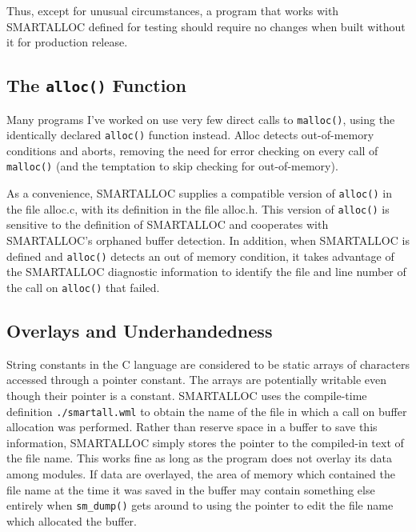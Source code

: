 Thus, except for unusual circumstances, a program that works with SMARTALLOC
defined for testing should require no changes when built without it for
production release. 

\subsection{ The {\tt alloc()} Function}

Many programs I've worked on use very few direct calls to {\tt malloc()},
using the identically declared {\tt alloc()} function instead. Alloc detects
out-of-memory conditions and aborts, removing the need for error checking on
every call of {\tt malloc()} (and the temptation to skip checking for
out-of-memory). 

As a convenience, SMARTALLOC supplies a compatible version of {\tt alloc()} in
the file alloc.c, with its definition in the file alloc.h. This version of
{\tt alloc()} is sensitive to the definition of SMARTALLOC and cooperates with
SMARTALLOC's orphaned buffer detection. In addition, when SMARTALLOC is
defined and {\tt alloc()} detects an out of memory condition, it takes
advantage of the SMARTALLOC diagnostic information to identify the file and
line number of the call on {\tt alloc()} that failed. 

\subsection{ Overlays and Underhandedness}

String constants in the C language are considered to be static arrays of
characters accessed through a pointer constant. The arrays are potentially
writable even though their pointer is a constant. SMARTALLOC uses the
compile-time definition {\tt ./smartall.wml} to obtain the name of the file in
which a call on buffer allocation was performed. Rather than reserve space in
a buffer to save this information, SMARTALLOC simply stores the pointer to the
compiled-in text of the file name. This works fine as long as the program does
not overlay its data among modules. If data are overlayed, the area of memory
which contained the file name at the time it was saved in the buffer may
contain something else entirely when {\tt sm\_dump()} gets around to using the
pointer to edit the file name which allocated the buffer. 


